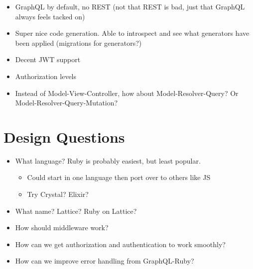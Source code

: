 \documentclass[11pt]{article}
\begin{document}
\begin{itemize}
\item GraphQL by default, no REST (not that REST is bad, just that GraphQL always feels tacked on)

\item Super nice code generation. Able to introspect and see what generators have been applied (migrations for generators?)

\item Decent JWT support

\item Authorization levels

\item Instead of Model-View-Controller, how about Model-Resolver-Query? Or Model-Resolver-Query-Mutation?
\end{itemize}

\section{Design Questions}
\label{sec-3}

\begin{itemize}
\item What language? Ruby is probably easiest, but least popular.
\begin{itemize}
\item Could start in one language then port over to others like JS
\item Try Crystal? Elixir?
\end{itemize}

\item What name? Lattice? Ruby on Lattice?

\item How should middleware work?

\item How can we get authorization and authentication to work smoothly?

\item How can we improve error handling from GraphQL-Ruby?
\end{itemize}
\end{document}
